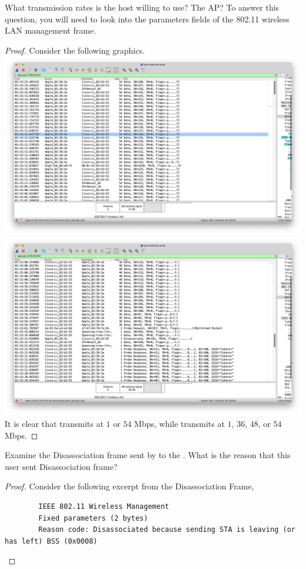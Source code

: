 \documentclass[../main.tex]{subfiles}
\begin{document}
\begin{wts}
    What transmission rates is the host willing to use? The AP? To answer this question, you will need to look into the parameters fields of the 802.11 wireless LAN management frame.
\end{wts}
\begin{proof}
    Consider the following graphics.\\
    \includegraphics[width=\textwidth]{subfiles/images/PART2_Q11_RATES_1.png}
    \includegraphics[width=\textwidth]{subfiles/images/PART2_Q11_RATES_2.png}
    It is clear that \apple transmits at $1$ or $54$ Mbps, while \cisco transmits at $1$, $36$, $48$, or $54$ Mbps.
\end{proof}
\newpage

\begin{wts}
    Examine the Disassociation frame sent by \apple to the \cisco. What is the reason that this user sent Disassociation frame?
\end{wts}
\begin{proof}
    Consider the following excerpt from the Disassociation Frame,\\
    \begin{lstlisting}
        IEEE 802.11 Wireless Management
        Fixed parameters (2 bytes)
        Reason code: Disassociated because sending STA is leaving (or has left) BSS (0x0008)\end{lstlisting}
\end{proof}
\end{document}
